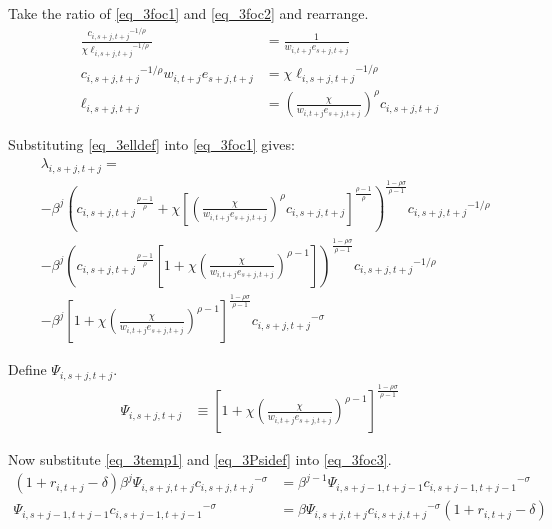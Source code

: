 \documentclass[letterpaper,12pt]{article}
\theoremstyle{definition}
\numberwithin{equation}{section}
\begin{document}
\begin{spacing}{1.5}
	Take the ratio of \eqref{eq_3foc1} and \eqref{eq_3foc2} and rearrange.
	\begin{align}
		\frac{{c_{i,s+j,t+j}}^{-1/\rho}} {\chi {\ell_{i,s+j,t+j}}^{-1/\rho}} \nonumber & = \frac{1} {w_{i,t+j} e_{s+j,t+j}} \nonumber \\
		{c_{i,s+j,t+j}}^{-1/\rho} w_{i,t+j} e_{s+j,t+j} & = \chi {\ell_{i,s+j,t+j}}^{-1/\rho} \nonumber \\
		\ell_{i,s+j,t+j} & = \left(\frac{\chi} {w_{i,t+j} e_{s+j,t+j}}\right)^{\rho} c_{i,s+j,t+j} \label{eq_3elldef}
	\end{align}	

	Substituting \eqref{eq_3elldef} into \eqref{eq_3foc1} gives:
	\begin{align}
	    & \lambda_{i,s+j,t+j} = \nonumber \\
		& - \beta^j \left( {c_{i,s+j,t+j}}^{\frac{\rho-1}{\rho}} + \chi \left[\left(\frac{\chi} {w_{i,t+j} e_{s+j,t+j}}\right)^{\rho} c_{i,s+j,t+j}\right]^{\frac{\rho-1}{\rho}}\right)^{\frac{1-\rho \sigma}{\rho-1}} {c_{i,s+j,t+j}}^{-1/\rho} \nonumber \\
		& - \beta^j \left( {c_{i,s+j,t+j}}^{\frac{\rho-1}{\rho}} \left[1 + \chi \left(\frac{\chi} {w_{i,t+j} e_{s+j,t+j}}\right)^{\rho-1} \right]\right)^{\frac{1-\rho \sigma}{\rho-1}} {c_{i,s+j,t+j}}^{-1/\rho} \nonumber \\
		& - \beta^j \left[1 + \chi \left(\frac{\chi} {w_{i,t+j} e_{s+j,t+j}}\right)^{\rho-1} \right]^{\frac{1-\rho \sigma}{\rho-1}} {c_{i,s+j,t+j}}^{-\sigma} \label{eq_3temp1}
	\end{align}

	Define $\Psi_{i,s+j,t+j}$.
	\begin{align}
        \Psi_{i,s+j,t+j} & \equiv \left[1 + \chi \left(\frac{\chi} {w_{i,t+j} e_{s+j,t+j}}\right)^{\rho-1} \right]^{\frac{1-\rho \sigma}{\rho-1}} \label{eq_3Psidef}
	\end{align}	

	Now substitute \eqref{eq_3temp1} and \eqref{eq_3Psidef} into \eqref{eq_3foc3}.
	\begin{align}
        (1+r_{i,t+j}-\delta) \beta^j \Psi_{i,s+j,t+j} {c_{i,s+j,t+j}}^{-\sigma} & = \beta^{j-1} \Psi_{i,s+j-1,t+j-1} {c_{i,s+j-1,t+j-1}}^{-\sigma} \nonumber \\
        \Psi_{i,s+j-1,t+j-1} {c_{i,s+j-1,t+j-1}}^{-\sigma} & = \beta \Psi_{i,s+j,t+j} {c_{i,s+j,t+j}}^{-\sigma} (1+r_{i,t+j}-\delta) \label{eq_3Euler}
	\end{align}	


\end{spacing}
\end{document}
